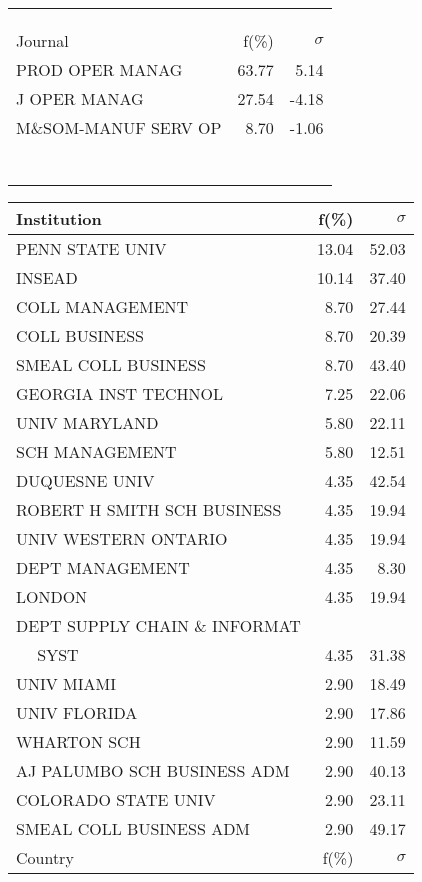 \documentclass[a4paper,11pt]{report}
\begin{document}
\begin{landscape}
\begin{table}[!ht]
{\begin{tabular}{|l r  r|}
 &  & \\
 &  & \\
 &  & \\
\hline
\hline
Journal & f(\%) & $\sigma$\\
\hline
PROD OPER MANAG & 63.77 & 5.14\\
J OPER MANAG & 27.54 & -4.18\\
M\&SOM-MANUF SERV OP & 8.70 & -1.06\\
 &  & \\
 &  & \\
 &  & \\
 &  & \\
 &  & \\
 &  & \\
 &  & \\
\hline
\end{tabular}
}
{\scriptsize\begin{tabular}{|l r r|}
\hline
Institution & f(\%) & $\sigma$\\
\hline
PENN STATE UNIV & 13.04 & 52.03\\
INSEAD & 10.14 & 37.40\\
COLL MANAGEMENT & 8.70 & 27.44\\
COLL BUSINESS & 8.70 & 20.39\\
SMEAL COLL BUSINESS & 8.70 & 43.40\\
GEORGIA INST TECHNOL & 7.25 & 22.06\\
UNIV MARYLAND & 5.80 & 22.11\\
SCH MANAGEMENT & 5.80 & 12.51\\
DUQUESNE UNIV & 4.35 & 42.54\\
ROBERT H SMITH SCH BUSINESS & 4.35 & 19.94\\
UNIV WESTERN ONTARIO & 4.35 & 19.94\\
DEPT MANAGEMENT & 4.35 & 8.30\\
LONDON & 4.35 & 19.94\\
DEPT SUPPLY CHAIN \& INFORMAT &  & \\
$\quad$ SYST & 4.35 & 31.38\\
UNIV MIAMI & 2.90 & 18.49\\
UNIV FLORIDA & 2.90 & 17.86\\
WHARTON SCH & 2.90 & 11.59\\
AJ PALUMBO SCH BUSINESS ADM & 2.90 & 40.13\\
COLORADO STATE UNIV & 2.90 & 23.11\\
SMEAL COLL BUSINESS ADM & 2.90 & 49.17\\
\hline
\hline
Country & f(\%) & $\sigma$\\

\end{tabular}}
\end{table}
\end{landscape}
\end{document}
